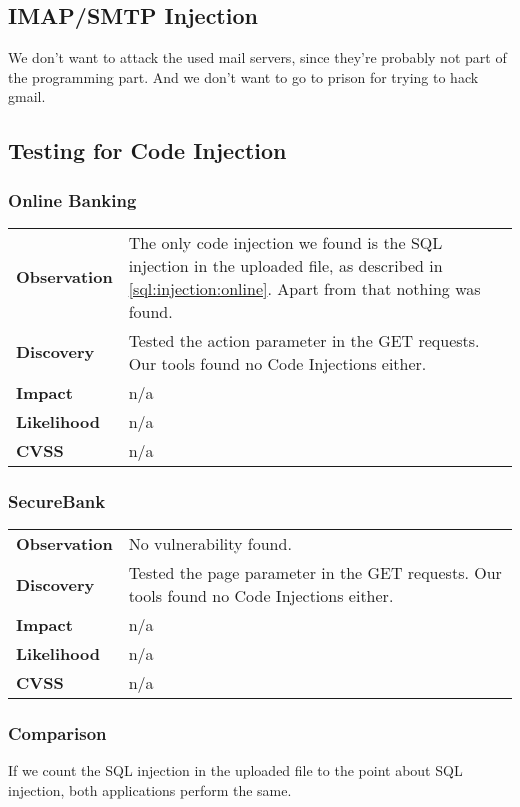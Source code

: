 \subsection{IMAP/SMTP Injection}

We don't want to attack the used mail servers, since they're probably not part of the programming part. And we don't want to go to prison for trying to hack gmail.

\subsection{Testing for Code Injection}

\subsubsection*{Online Banking}

\begin{tabular}{l|p{10cm}}
\textbf{Observation} & The only code injection we found is the SQL injection in the uploaded file, as described in \ref{sql:injection:online}. Apart from that nothing was found.\\
\textbf{Discovery} & Tested the action parameter in the GET requests. Our tools found no Code Injections either.\\
\textbf{Impact} & n/a \\
\textbf{Likelihood} & n/a \\
\textbf{CVSS} & n/a \\
\end{tabular}

\subsubsection*{SecureBank}

\begin{tabular}{l|p{10cm}}
\textbf{Observation} & No vulnerability found.\\
\textbf{Discovery} & Tested the page parameter in the GET requests. Our tools found no Code Injections either.\\
\textbf{Impact} & n/a \\
\textbf{Likelihood} & n/a \\
\textbf{CVSS} & n/a \\
\end{tabular}

\subsubsection*{Comparison}
If we count the SQL injection in the uploaded file to the point about SQL injection, both applications perform the same.

